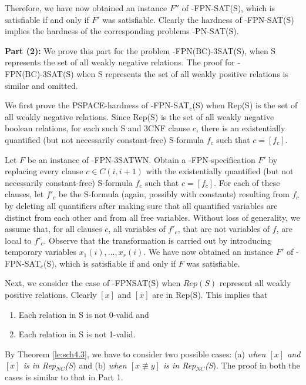 Therefore, we have now obtained an instance $F''$ 
of {-FPN-SAT(S)}, which is satisfiable
if and only if $F'$ was satisfiable. Clearly the hardness of
{-FPN-SAT(S)} implies the hardness of the corresponding problems 
{-PN-SAT(S)}.


\noindent
{\bf Part (2): }
We prove  this part for the problem {-FPN(BC)-3SAT(S)}, when 
{\sf S} represents the set of all weakly negative relations.
The proof for {-FPN(BC)-3SAT(S)} when {\sf S} represents 
the set of all weakly positive relations is similar and omitted.

We first prove the {\sf PSPACE}-hardness of {-FPN-SAT$_c$(S)}
when {\sf Rep(S)} is the set of all weakly negative relations.
Since {\sf Rep(S)} is the set of all weakly negative  boolean relations,
for each such {\sf S} and {\sf 3CNF} clause $c$,
there is an existentially quantified (but not necessarily constant-free)
{\sf S}-formula $f_c$ such that $c=[f_c]$. 

Let $F$ be an instance of {-FPN-3SATWN}. 
Obtain a {-FPN}-specification $F'$ 
by replacing every clause $c \in C(i, i+1)$ with the 
existentially quantified (but not necessarily constant-free)
{\sf S}-formula $f_c$ such that $c=[f_c]$. For each of these clauses,
let $f'_c$ be the {\sf S}-formula (again, possibly with
constants) resulting from $f_{c}$ by deleting
all quantifiers after making sure that all quantified variables are
distinct from each other and from all free variables.  Without loss of
generality, we assume that, for all clauses $c$,
all variables of $f'_c$, that are not variables
of $f$, are local to $f'_c$.
Observe that the transformation is carried out by introducing temporary
variables $x_1(i), \ldots, x_r(i)$.
We have now obtained an instance $F'$ of {-FPN-SAT$_c$(S)}, 
which is satisfiable if and only if $F$ was satisfiable. 

Next, we consider the case  of {-FPNSAT(S)} when $Rep(S)$ 
represent all weakly positive relations. 
Clearly $[x]$ and $[\overline{x}]$  are in {\sf Rep(S)}.
This implies that 
\begin{enumerate}
\item
Each relation in {\sf S} is not 0-valid and

\item
Each relation in {\sf S} is not 1-valid.
\end{enumerate}
By Theorem \ref{le:sch4.3}, we have to consider two possible cases:
(a) {\em when $[x]$ and $[\overline{x}]$ is in {\sf Rep}$_{NC}$({\sf S}}) and
(b) {\em when $[x \not\equiv y ]$  is in {\sf Rep}$_{NC}$({\sf S}}).
The proof in both the cases is similar to that in Part 1. \hfill\QED

